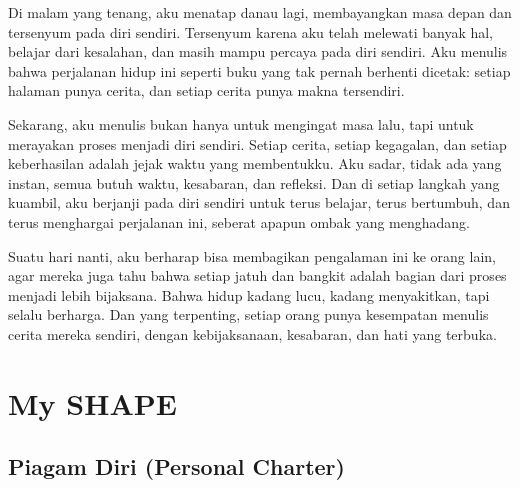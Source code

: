 \documentclass[
  letterpaper,
  DIV=11,
  numbers=noendperiod]{scrreprt}
\begin{document}
Di malam yang tenang, aku menatap danau lagi, membayangkan masa depan
dan tersenyum pada diri sendiri. Tersenyum karena aku telah melewati
banyak hal, belajar dari kesalahan, dan masih mampu percaya pada diri
sendiri. Aku menulis bahwa perjalanan hidup ini seperti buku yang tak
pernah berhenti dicetak: setiap halaman punya cerita, dan setiap cerita
punya makna tersendiri.

Sekarang, aku menulis bukan hanya untuk mengingat masa lalu, tapi untuk
merayakan proses menjadi diri sendiri. Setiap cerita, setiap kegagalan,
dan setiap keberhasilan adalah jejak waktu yang membentukku. Aku sadar,
tidak ada yang instan, semua butuh waktu, kesabaran, dan refleksi. Dan
di setiap langkah yang kuambil, aku berjanji pada diri sendiri untuk
terus belajar, terus bertumbuh, dan terus menghargai perjalanan ini,
seberat apapun ombak yang menghadang.

Suatu hari nanti, aku berharap bisa membagikan pengalaman ini ke orang
lain, agar mereka juga tahu bahwa setiap jatuh dan bangkit adalah bagian
dari proses menjadi lebih bijaksana. Bahwa hidup kadang lucu, kadang
menyakitkan, tapi selalu berharga. Dan yang terpenting, setiap orang
punya kesempatan menulis cerita mereka sendiri, dengan kebijaksanaan,
kesabaran, dan hati yang terbuka.


\chapter{My SHAPE}\label{my-shape}

\section{Piagam Diri (Personal
Charter)}\label{piagam-diri-personal-charter}
\end{document}
